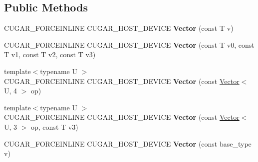 \subsection*{Public Methods}
\begin{DoxyCompactItemize}
\item 
\mbox{\label{structcugar_1_1_vector_3_01_t_00_014_01_4_aa2b93ff072334709cdb87c666638f7b4}} 
C\+U\+G\+A\+R\+\_\+\+F\+O\+R\+C\+E\+I\+N\+L\+I\+NE C\+U\+G\+A\+R\+\_\+\+H\+O\+S\+T\+\_\+\+D\+E\+V\+I\+CE {\bfseries Vector} (const T v)
\item 
\mbox{\label{structcugar_1_1_vector_3_01_t_00_014_01_4_ace59cec0475085462cf851466e064eb2}} 
C\+U\+G\+A\+R\+\_\+\+F\+O\+R\+C\+E\+I\+N\+L\+I\+NE C\+U\+G\+A\+R\+\_\+\+H\+O\+S\+T\+\_\+\+D\+E\+V\+I\+CE {\bfseries Vector} (const T v0, const T v1, const T v2, const T v3)
\item 
\mbox{\label{structcugar_1_1_vector_3_01_t_00_014_01_4_a05a9f0eb34842ce575e622f298094c2a}} 
{\footnotesize template$<$typename U $>$ }\\C\+U\+G\+A\+R\+\_\+\+F\+O\+R\+C\+E\+I\+N\+L\+I\+NE C\+U\+G\+A\+R\+\_\+\+H\+O\+S\+T\+\_\+\+D\+E\+V\+I\+CE {\bfseries Vector} (const \hyperlink{structcugar_1_1_vector}{Vector}$<$ U, 4 $>$ op)
\item 
\mbox{\label{structcugar_1_1_vector_3_01_t_00_014_01_4_a14e4fe129f5f452218340ba35a3ad925}} 
{\footnotesize template$<$typename U $>$ }\\C\+U\+G\+A\+R\+\_\+\+F\+O\+R\+C\+E\+I\+N\+L\+I\+NE C\+U\+G\+A\+R\+\_\+\+H\+O\+S\+T\+\_\+\+D\+E\+V\+I\+CE {\bfseries Vector} (const \hyperlink{structcugar_1_1_vector}{Vector}$<$ U, 3 $>$ op, const T v3)
\item 
\mbox{\label{structcugar_1_1_vector_3_01_t_00_014_01_4_abead28f75bb3425109fc62d540a2ec5d}} 
C\+U\+G\+A\+R\+\_\+\+F\+O\+R\+C\+E\+I\+N\+L\+I\+NE C\+U\+G\+A\+R\+\_\+\+H\+O\+S\+T\+\_\+\+D\+E\+V\+I\+CE {\bfseries Vector} (const base\+\_\+type v)
\item 
\mbox{\label{structcugar_1_1_vector_3_01_t_00_014_01_4_aa17f9573040cd9195d69fde6c9efb17e}} 

\end{DoxyCompactItemize}
